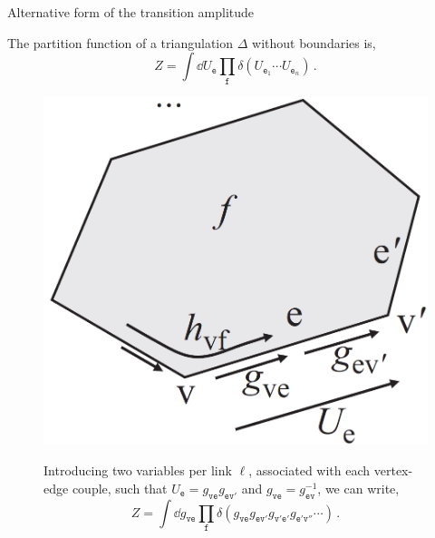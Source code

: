 \documentclass[12pt,titlepage]{article}
\begin{document}
\begin{frame}{Alternative form of the transition amplitude}
    \begin{list}{\,}{\leftmargin=1em \itemindent=0em}
        \item<1-> The partition function of a triangulation $\Delta$ without boundaries is,
        \begin{equation}
            Z=\int\dd{U_\mathtt{e}}\prod_\mathtt{f}\delta(U_{\mathtt{e}_1}\cdots U_{\mathtt{e}_n})\,.
        \end{equation}
        \item<2-> \noindent\FloatBarrier
        \begin{figure}[!ht]
            \begin{minipage}{0.25\linewidth}
                \includegraphics[width=\linewidth]{4.12.png}
            \end{minipage}
            \begin{minipage}{0.75\linewidth}
                Introducing two variables per link $\ell$, associated with each vertex-edge couple, such that $U_\mathtt{e}=g_{\mathtt{ve}}g_{\mathtt{ev'}}$ and $g_{\mathtt{ve}}=g^{-1}_{\mathtt{ev}}$, we can write,
                \begin{equation}
                    Z=\int\dd{g_\mathtt{ve}}\prod_\mathtt{f}\delta(g_\mathtt{ve}g_\mathtt{ev'}g_\mathtt{v'e'}g_\mathtt{e'v''}\cdots)\,.
                \end{equation}

\end{minipage}
\end{figure}
\end{list}
\end{frame}
\end{document}

